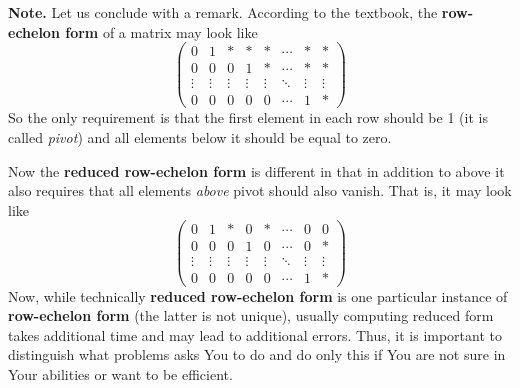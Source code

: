 \documentclass[8pt]{article} %
\begin{document}
{\bf Note.} Let us conclude with a remark. According to the textbook, the {\bf row-echelon form} of a matrix may look like
\[\begin{pmatrix} 0&1&*&*&*&\cdots&*&*\\ 0&0&0&1&*&\cdots&*&*
	\\\vdots&\vdots&\vdots&\vdots&\vdots&\ddots&\vdots&\vdots\\
	0&0&0&0&0&\cdots&1&*\end{pmatrix}\]
	So the only requirement is that the first element in each row should be 1 (it is called {\it pivot}) and all elements below it should be
	equal to zero.

	Now the {\bf reduced row-echelon form} is different in that in addition to above it also requires that all elements {\it above} pivot
	should also vanish. That is, it may look like
	\[\begin{pmatrix} 0&1&*&0&*&\cdots&0&0\\ 0&0&0&1&0&\cdots&0&*
		\\\vdots&\vdots&\vdots&\vdots&\vdots&\ddots&\vdots&\vdots\\
		0&0&0&0&0&\cdots&1&*\end{pmatrix}\]
	Now, while technically {\bf reduced row-echelon form} is one particular instance of {\bf row-echelon form} (the latter is not
	unique), usually computing reduced form takes additional time and may lead to additional errors. Thus, it is important to distinguish
	what problems asks You to do and do only this if You are not sure in Your abilities or want to be efficient.
\end{document}
